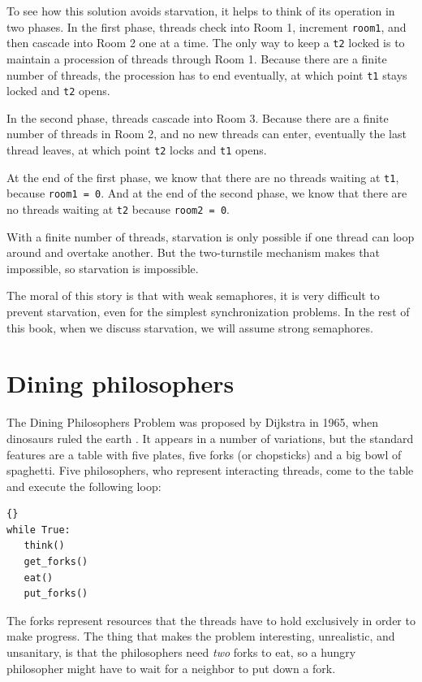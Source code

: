 \documentclass{book}
\begin{document}
To see how this solution avoids starvation, it helps to think of its
operation in two phases.  In the first phase, threads check into Room
1, increment {\tt room1}, and then cascade into Room 2 one at a time.
The only way to keep a {\tt t2} locked is to maintain a
procession of threads through Room 1.  Because there are a finite
number of threads, the procession has to end eventually, at which
point {\tt t1} stays locked and {\tt t2} opens.

In the second phase, threads cascade into Room 3.
Because there are a finite number of threads in Room 2, and
no new threads can enter, eventually the last thread leaves, at
which point {\tt t2} locks and {\tt t1} opens.

At the end of the first phase, we know that there are no threads
waiting at {\tt t1}, because {\tt room1 = 0}.  And at the end of the
second phase, we know that there are no threads waiting at {\tt t2}
because {\tt room2 = 0}.

With a finite number of threads, starvation is only possible if one
thread can loop around and overtake another.  But the two-turnstile
mechanism makes that impossible, so starvation is impossible.

The moral of this story is that with weak semaphores, it is very
difficult to prevent starvation, even for the simplest synchronization
problems.  In the rest of this book, when we discuss starvation, we
will assume strong semaphores.




\section{Dining philosophers}
\label{dining}

The Dining Philosophers Problem was proposed by Dijkstra in
1965, when dinosaurs ruled the earth \cite{dijkstra65}.  It
appears in a number of variations, but the standard features
are a table with five plates, five forks (or chopsticks) and
a big bowl of spaghetti.  Five philosophers, who represent
interacting threads, come to the table and execute the
following loop:

\newpage
\begin{lstlisting}[title={Basic philosopher loop}]{}
while True:
   think()
   get_forks()
   eat()
   put_forks()
\end{lstlisting}

The forks represent resources that the threads have to hold
exclusively in order to make progress.  The thing that makes the
problem interesting, unrealistic, and unsanitary, is that the
philosophers need {\em two} forks to eat, so a hungry philosopher
might have to wait for a neighbor to put down a fork.
\end{document}
